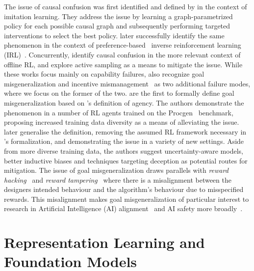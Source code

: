 \documentclass[../main.tex]{subfiles}
\begin{document}
The issue of causal confusion was first identified and defined by \citet{de_haan_causal_2019} in the
context of imitation learning. They address the issue by learning a graph-parametrized policy for
each possible causal graph and subsequently performing targeted interventions to select the best
policy.  later successfully identify the same phenomenon in the context of
preference-based~\citep{christiano_deep_2017} inverse reinforcement learning
(IRL)~\citep{ng_algorithms_2000}. Concurrently, \citet{gupta_can_2022} identify causal confusion in
the more relevant context of offline RL, and explore active sampling as a means to mitigate the
issue. While these works focus mainly on capability failures, \citet{kirk_causal_2022} also
recognize goal misgeneralization and incentive mismanagement~\citep{farquhar_path-specific_2022} as
two additional failure modes, where we focus on the former of the two. 
are the first to formally define goal misgeneralization based on \citet{orseau_agents_2018}'s
definition of agency. The authors demonstrate the phenomenon in a number of RL agents trained on the
Procgen~\citep{cobbe_leveraging_2020} benchmark, proposing increased training data diversity as
a means of alleviating the issue.  later generalise the definition, removing
the assumed RL framework necessary in \citet{langosco_goal_2022}'s formalization, and demonstrating
the issue in a variety of new settings. Aside from more diverse training data, the authors suggest
uncertainty-aware models, better inductive biases and techniques targeting deception as potential
routes for mitigation. The issue of goal misgeneralization draws parallels with \textit{reward
	hacking}~\citep{pan_effects_2022, skalse_defining_2022} and \textit{reward
	tampering}~\citep{everitt_reward_2021} where there is a misalignment between the designers intended
behaviour and the algorithm's behaviour due to misspecified rewards. This misalignment makes goal
misgeneralization of particular interest to research in Artificial Intelligence (AI)
alignment~\citep{ngo_alignment_2022} and AI safety more broadly~\citep{hendrycks_unsolved_2022,
	houben_inspect_2022}.

\section{Representation Learning and Foundation Models}
\end{document}
